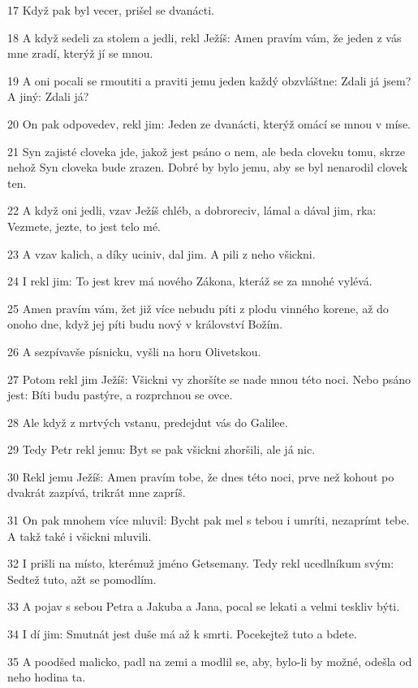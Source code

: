 \par 17 Když pak byl vecer, prišel se dvanácti.
\par 18 A když sedeli za stolem a jedli, rekl Ježíš: Amen pravím vám, že jeden z vás mne zradí, kterýž jí se mnou.
\par 19 A oni pocali se rmoutiti a praviti jemu jeden každý obzvláštne: Zdali já jsem? A jiný: Zdali já?
\par 20 On pak odpovedev, rekl jim: Jeden ze dvanácti, kterýž omácí se mnou v míse.
\par 21 Syn zajisté cloveka jde, jakož jest psáno o nem, ale beda cloveku tomu, skrze nehož Syn cloveka bude zrazen. Dobré by bylo jemu, aby se byl nenarodil clovek ten.
\par 22 A když oni jedli, vzav Ježíš chléb, a dobroreciv, lámal a dával jim, rka: Vezmete, jezte, to jest telo mé.
\par 23 A vzav kalich, a díky uciniv, dal jim. A pili z neho všickni.
\par 24 I rekl jim: To jest krev má nového Zákona, kteráž se za mnohé vylévá.
\par 25 Amen pravím vám, žet již více nebudu píti z plodu vinného korene, až do onoho dne, když jej píti budu nový v království Božím.
\par 26 A sezpívavše písnicku, vyšli na horu Olivetskou.
\par 27 Potom rekl jim Ježíš: Všickni vy zhoršíte se nade mnou této noci. Nebo psáno jest: Bíti budu pastýre, a rozprchnou se ovce.
\par 28 Ale když z mrtvých vstanu, predejdut vás do Galilee.
\par 29 Tedy Petr rekl jemu: Byt se pak všickni zhoršili, ale já nic.
\par 30 Rekl jemu Ježíš: Amen pravím tobe, že dnes této noci, prve než kohout po dvakrát zazpívá, trikrát mne zapríš.
\par 31 On pak mnohem více mluvil: Bycht pak mel s tebou i umríti, nezaprímt tebe. A takž také i všickni mluvili.
\par 32 I prišli na místo, kterémuž jméno Getsemany. Tedy rekl ucedlníkum svým: Sedtež tuto, ažt se pomodlím.
\par 33 A pojav s sebou Petra a Jakuba a Jana, pocal se lekati a velmi teskliv býti.
\par 34 I dí jim: Smutnát jest duše má až k smrti. Pocekejtež tuto a bdete.
\par 35 A poodšed malicko, padl na zemi a modlil se, aby, bylo-li by možné, odešla od neho hodina ta.

